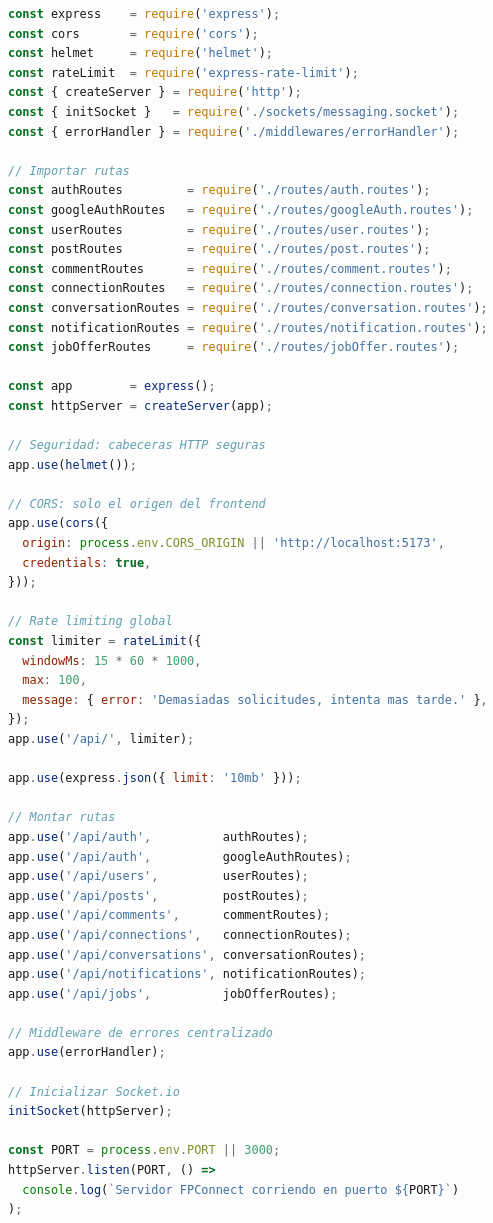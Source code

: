 \documentclass[a4paper]{report}
\begin{document}
\begin{lstlisting}[language=JavaScript,
  caption={src/index.js -- Configuración principal del servidor}]
const express    = require('express');
const cors       = require('cors');
const helmet     = require('helmet');
const rateLimit  = require('express-rate-limit');
const { createServer } = require('http');
const { initSocket }   = require('./sockets/messaging.socket');
const { errorHandler } = require('./middlewares/errorHandler');

// Importar rutas
const authRoutes         = require('./routes/auth.routes');
const googleAuthRoutes   = require('./routes/googleAuth.routes');
const userRoutes         = require('./routes/user.routes');
const postRoutes         = require('./routes/post.routes');
const commentRoutes      = require('./routes/comment.routes');
const connectionRoutes   = require('./routes/connection.routes');
const conversationRoutes = require('./routes/conversation.routes');
const notificationRoutes = require('./routes/notification.routes');
const jobOfferRoutes     = require('./routes/jobOffer.routes');

const app        = express();
const httpServer = createServer(app);

// Seguridad: cabeceras HTTP seguras
app.use(helmet());

// CORS: solo el origen del frontend
app.use(cors({
  origin: process.env.CORS_ORIGIN || 'http://localhost:5173',
  credentials: true,
}));

// Rate limiting global
const limiter = rateLimit({
  windowMs: 15 * 60 * 1000,
  max: 100,
  message: { error: 'Demasiadas solicitudes, intenta mas tarde.' },
});
app.use('/api/', limiter);

app.use(express.json({ limit: '10mb' }));

// Montar rutas
app.use('/api/auth',          authRoutes);
app.use('/api/auth',          googleAuthRoutes);
app.use('/api/users',         userRoutes);
app.use('/api/posts',         postRoutes);
app.use('/api/comments',      commentRoutes);
app.use('/api/connections',   connectionRoutes);
app.use('/api/conversations', conversationRoutes);
app.use('/api/notifications', notificationRoutes);
app.use('/api/jobs',          jobOfferRoutes);

// Middleware de errores centralizado
app.use(errorHandler);

// Inicializar Socket.io
initSocket(httpServer);

const PORT = process.env.PORT || 3000;
httpServer.listen(PORT, () =>
  console.log(`Servidor FPConnect corriendo en puerto ${PORT}`)
);
\end{lstlisting}
\end{document}

